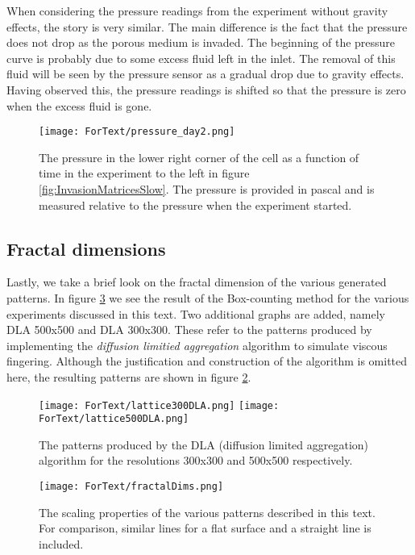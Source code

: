 \documentclass[twoside,utf8]{article}
\begin{document}
When considering the pressure readings from the experiment without gravity effects, the story is very similar. The main difference is the fact that the pressure does not drop as the porous medium is invaded. The beginning of the pressure curve is probably due to some excess fluid left in the inlet. The removal of this fluid will be seen by the pressure sensor as a gradual drop due to gravity effects. Having observed this, the pressure readings is shifted so that the pressure is zero when the excess fluid is gone.


\begin{figure}[H]
	\texttt{[image: ForText/pressure\_day2.png]}
	\caption{The pressure in the lower right corner of the cell as a function of time in the experiment to the left in figure \ref{fig:InvasionMatricesSlow}. The pressure is provided in pascal and is measured relative to the pressure when the experiment started. }
	\label{fig:pressureDay2}
\end{figure}







\subsection{Fractal dimensions}
Lastly, we take a brief look on the fractal dimension of the various generated patterns. In figure \ref{fig:fractalDims} we see the result of the Box-counting method for the various experiments discussed in this text. Two additional graphs are added, namely DLA 500x500 and DLA 300x300. These refer to the patterns produced by implementing the
{\it diffusion limitied aggregation} algorithm to simulate viscous fingering. Although the justification and construction of the algorithm is omitted here, the resulting patterns are shown in figure \ref{fig:dla}.

\begin{figure}[H]
	\begin{center}
\texttt{[image: ForText/lattice300DLA.png]}
\texttt{[image: ForText/lattice500DLA.png]}
	\end{center}
	\caption{The patterns produced by the DLA (diffusion limited aggregation) algorithm for the resolutions 300x300 and 500x500 respectively. }
	\label{fig:dla}
\end{figure}

\begin{figure}[H]
	\begin{center}
	\texttt{[image: ForText/fractalDims.png]}
	\end{center}
	\caption{The scaling properties of the various patterns described in this text. For comparison, similar lines for a flat surface and a straight line is included.  }
	\label{fig:fractalDims}
\end{figure}
\end{document}
